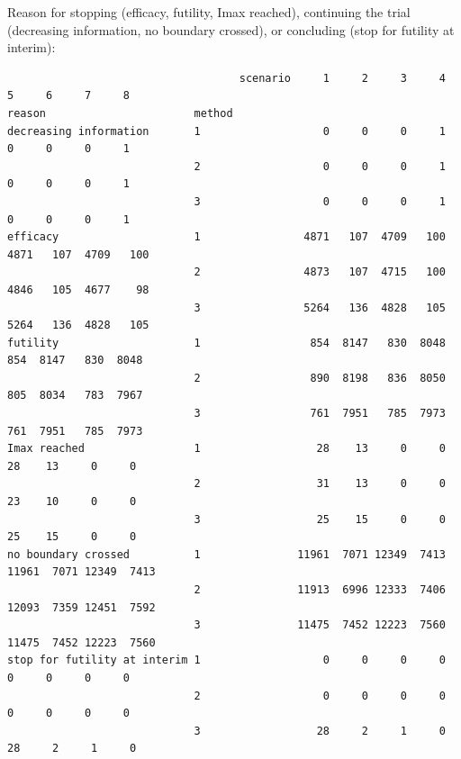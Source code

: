 \documentclass[12pt]{article}
\begin{document}
Reason for stopping (efficacy, futility, Imax reached), continuing the
trial (decreasing information, no boundary crossed), or concluding
(stop for futility at interim):
\begin{verbatim}
                                    scenario     1     2     3     4     5     6     7     8
reason                       method                                                         
decreasing information       1                   0     0     0     1     0     0     0     1
                             2                   0     0     0     1     0     0     0     1
                             3                   0     0     0     1     0     0     0     1
efficacy                     1                4871   107  4709   100  4871   107  4709   100
                             2                4873   107  4715   100  4846   105  4677    98
                             3                5264   136  4828   105  5264   136  4828   105
futility                     1                 854  8147   830  8048   854  8147   830  8048
                             2                 890  8198   836  8050   805  8034   783  7967
                             3                 761  7951   785  7973   761  7951   785  7973
Imax reached                 1                  28    13     0     0    28    13     0     0
                             2                  31    13     0     0    23    10     0     0
                             3                  25    15     0     0    25    15     0     0
no boundary crossed          1               11961  7071 12349  7413 11961  7071 12349  7413
                             2               11913  6996 12333  7406 12093  7359 12451  7592
                             3               11475  7452 12223  7560 11475  7452 12223  7560
stop for futility at interim 1                   0     0     0     0     0     0     0     0
                             2                   0     0     0     0     0     0     0     0
                             3                  28     2     1     0    28     2     1     0
\end{verbatim}
\end{document}
